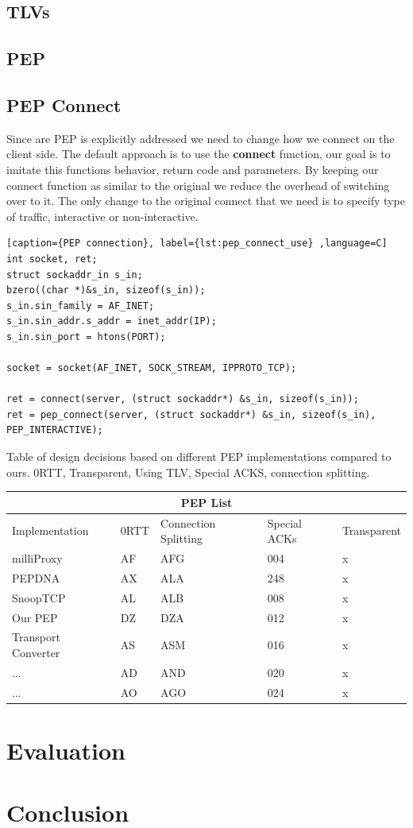 \documentclass[a4paper,english, 11pt]{report}
\begin{document}
\section{TLVs}

\section{PEP}

\section{PEP Connect}
Since are PEP is explicitly addressed we need to change how we connect on the client side.
The default approach is to use the \textbf{connect} function, our goal is to imitate this functions behavior, return code and parameters. By keeping our connect function as similar to the original we reduce the overhead of switching over to it. The only change to the original connect that we need is to specify type of traffic, interactive or non-interactive.
\begin{lstlisting}[caption={PEP connection}, label={lst:pep_connect_use} ,language=C]
int socket, ret;
struct sockaddr_in s_in;
bzero((char *)&s_in, sizeof(s_in));
s_in.sin_family = AF_INET;
s_in.sin_addr.s_addr = inet_addr(IP);
s_in.sin_port = htons(PORT);

socket = socket(AF_INET, SOCK_STREAM, IPPROTO_TCP);

ret = connect(server, (struct sockaddr*) &s_in, sizeof(s_in));
ret = pep_connect(server, (struct sockaddr*) &s_in, sizeof(s_in), PEP_INTERACTIVE);
\end{lstlisting}




{Table of design decisions based on different PEP implementations compared to ours.}
{0RTT, Transparent, Using TLV, Special ACKS, connection splitting.}\\
\begin{tabular}{ |p{4cm}||p{2cm}|p{2cm}|p{2cm}|p{2cm}| }
 \hline
 \multicolumn{5}{|c|}{PEP List} \\
 \hline
 Implementation& 0RTT &Connection Splitting &Special ACKs &Transparent\\
 \hline
 milliProxy   & AF    &AFG&   004 & x\\
 PEPDNA&   AX  & ALA   &248 & x\\
 SnoopTCP &AL & ALB&  008 & x\\
 Our PEP    &DZ & DZA&  012& x \\
 Transport Converter &   AS  & ASM&016& x\\
 ...& AD  & AND   &020& x\\
 ...& AO  & AGO&024& x\\
 \hline
\end{tabular}

\chapter{Evaluation}
\chapter{Conclusion}

{}

\end{document}

